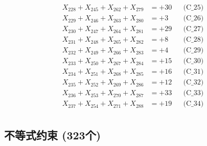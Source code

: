 \documentclass[a4paper,10pt]{article}
\begin{document}
{\begin{align}
X_{228} + X_{245} + X_{262} + X_{279} &= +30 && \text{(C\_25)} \\
\allowbreak
X_{229} + X_{246} + X_{263} + X_{280} &= +3 && \text{(C\_26)} \\
X_{230} + X_{247} + X_{264} + X_{281} &= +29 && \text{(C\_27)} \\
X_{231} + X_{248} + X_{265} + X_{282} &= +8 && \text{(C\_28)} \\
X_{232} + X_{249} + X_{266} + X_{283} &= +4 && \text{(C\_29)} \\
X_{233} + X_{250} + X_{267} + X_{284} &= +15 && \text{(C\_30)} \\
\allowbreak
X_{234} + X_{251} + X_{268} + X_{285} &= +16 && \text{(C\_31)} \\
X_{235} + X_{252} + X_{269} + X_{286} &= +12 && \text{(C\_32)} \\
X_{236} + X_{253} + X_{270} + X_{287} &= +33 && \text{(C\_33)} \\
X_{237} + X_{254} + X_{271} + X_{288} &= +19 && \text{(C\_34)} \\
\end{align}
}

\subsection{不等式约束 (323个)}
\end{document}
